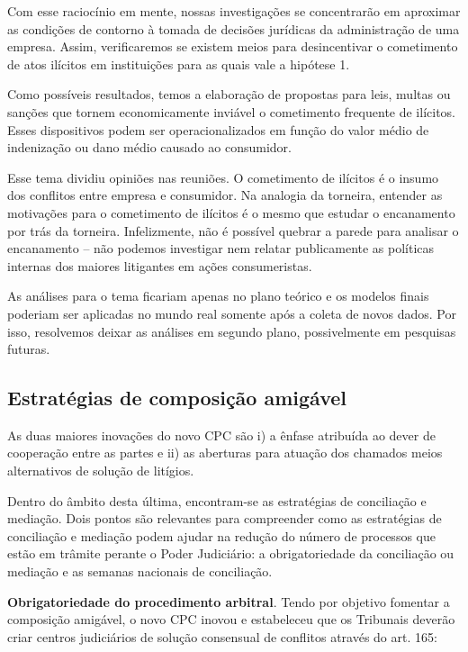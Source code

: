 \documentclass[]{report}
\begin{document}
Com esse raciocínio em mente, nossas investigações se concentrarão em
aproximar as condições de contorno à tomada de decisões jurídicas da
administração de uma empresa. Assim, verificaremos se existem meios para
desincentivar o cometimento de atos ilícitos em instituições para as
quais vale a hipótese 1.

Como possíveis resultados, temos a elaboração de propostas para leis,
multas ou sanções que tornem economicamente inviável o cometimento
frequente de ilícitos. Esses dispositivos podem ser operacionalizados em
função do valor médio de indenização ou dano médio causado ao
consumidor.

Esse tema dividiu opiniões nas reuniões. O cometimento de ilícitos é o
insumo dos conflitos entre empresa e consumidor. Na analogia da
torneira, entender as motivações para o cometimento de ilícitos é o
mesmo que estudar o encanamento por trás da torneira. Infelizmente, não
é possível quebrar a parede para analisar o encanamento -- não podemos
investigar nem relatar publicamente as políticas internas dos maiores
litigantes em ações consumeristas.

As análises para o tema ficariam apenas no plano teórico e os modelos
finais poderiam ser aplicadas no mundo real somente após a coleta de
novos dados. Por isso, resolvemos deixar as análises em segundo plano,
possivelmente em pesquisas futuras.

\subsection{Estratégias de composição
amigável}\label{estrategias-de-composicao-amigavel}

As duas maiores inovações do novo CPC são i) a ênfase atribuída ao dever
de cooperação entre as partes e ii) as aberturas para atuação dos
chamados meios alternativos de solução de litígios.

Dentro do âmbito desta última, encontram-se as estratégias de
conciliação e mediação. Dois pontos são relevantes para compreender como
as estratégias de conciliação e mediação podem ajudar na redução do
número de processos que estão em trâmite perante o Poder Judiciário: a
obrigatoriedade da conciliação ou mediação e as semanas nacionais de
conciliação.

\textbf{Obrigatoriedade do procedimento arbitral}. Tendo por objetivo
fomentar a composição amigável, o novo CPC inovou e estabeleceu que os
Tribunais deverão criar centros judiciários de solução consensual de
conflitos através do art. 165:
\end{document}
